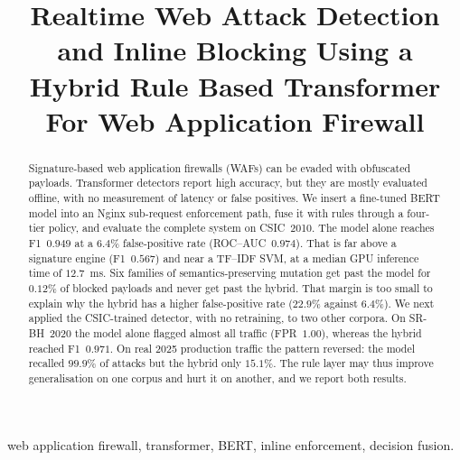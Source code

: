 \documentclass[conference]{IEEEtran}
\begin{document}
\title{Realtime Web Attack Detection and Inline Blocking Using a Hybrid
Rule Based Transformer For Web Application Firewall}

\author{
\and
{}
}

\maketitle

\begin{abstract}
Signature-based web application firewalls (WAFs) can be evaded with
obfuscated payloads. Transformer detectors report high accuracy, but they
are mostly evaluated offline, with no measurement of latency or false
positives. We insert a fine-tuned BERT model into an Nginx sub-request
enforcement path, fuse it with rules through a four-tier policy, and
evaluate the complete system on CSIC~2010. The model alone reaches
F1~$0.949$ at a $6.4\%$ false-positive rate (ROC--AUC~$0.974$). That is far
above a signature engine (F1~$0.567$) and near a TF--IDF SVM, at a median
GPU inference time of $12.7$~ms. Six families of semantics-preserving
mutation get past the model for $0.12\%$ of blocked payloads and never get
past the hybrid. That margin is too small to explain why the hybrid has a
higher false-positive rate ($22.9\%$ against $6.4\%$). We next applied the
CSIC-trained detector, with no retraining, to two other corpora. On
SR-BH~2020 the model alone flagged almost all traffic (FPR~$1.00$), whereas
the hybrid reached F1~$0.971$. On real 2025 production traffic the pattern
reversed: the model recalled $99.9\%$ of attacks but the hybrid only
$15.1\%$. The rule layer may thus improve generalisation on one corpus and
hurt it on another, and we report both results.
\end{abstract}

\begin{IEEEkeywords}
web application firewall, transformer, BERT, inline enforcement, decision fusion.
\end{IEEEkeywords}
\end{document}
